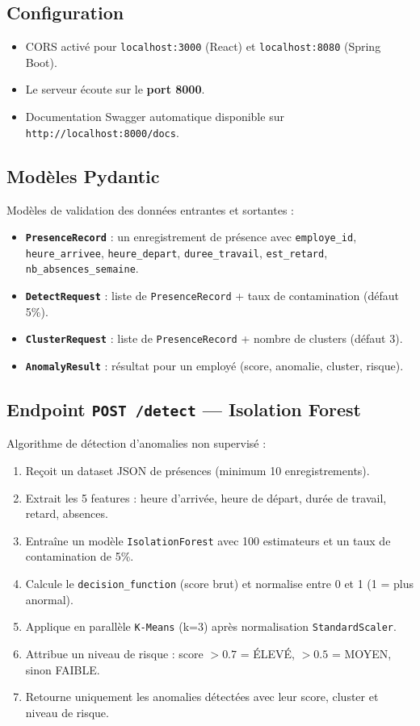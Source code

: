 \documentclass[a4paper,12pt]{report}
\begin{document}
\subsection{Configuration}
\begin{itemize}
  \item CORS activé pour \texttt{localhost:3000} (React) et \texttt{localhost:8080} (Spring Boot).
  \item Le serveur écoute sur le \textbf{port 8000}.
  \item Documentation Swagger automatique disponible sur \texttt{http://localhost:8000/docs}.
\end{itemize}

\subsection{Modèles Pydantic}
Modèles de validation des données entrantes et sortantes :
\begin{itemize}
  \item \textbf{\texttt{PresenceRecord}} : un enregistrement de présence avec \texttt{employe\_id}, \texttt{heure\_arrivee}, \texttt{heure\_depart}, \texttt{duree\_travail}, \texttt{est\_retard}, \texttt{nb\_absences\_semaine}.
  \item \textbf{\texttt{DetectRequest}} : liste de \texttt{PresenceRecord} + taux de contamination (défaut 5\%).
  \item \textbf{\texttt{ClusterRequest}} : liste de \texttt{PresenceRecord} + nombre de clusters (défaut 3).
  \item \textbf{\texttt{AnomalyResult}} : résultat pour un employé (score, anomalie, cluster, risque).
\end{itemize}

\subsection{Endpoint \texttt{POST /detect} --- Isolation Forest}
Algorithme de détection d'anomalies non supervisé :
\begin{enumerate}
  \item Reçoit un dataset JSON de présences (minimum 10 enregistrements).
  \item Extrait les 5 features : heure d'arrivée, heure de départ, durée de travail, retard, absences.
  \item Entraîne un modèle \texttt{IsolationForest} avec 100 estimateurs et un taux de contamination de 5\%.
  \item Calcule le \texttt{decision\_function} (score brut) et normalise entre 0 et 1 (1 = plus anormal).
  \item Applique en parallèle \texttt{K-Means} (k=3) après normalisation \texttt{StandardScaler}.
  \item Attribue un niveau de risque : score $> 0.7$ = ÉLEVÉ, $> 0.5$ = MOYEN, sinon FAIBLE.
  \item Retourne uniquement les anomalies détectées avec leur score, cluster et niveau de risque.
\end{enumerate}
\end{document}
